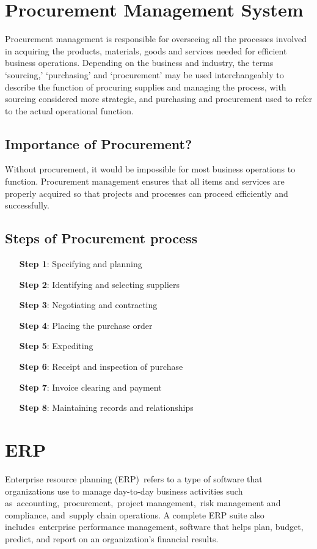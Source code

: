 \documentclass[12pt, a4paper]{article}
\begin{document}
\section{Procurement Management System}
Procurement management is responsible for overseeing all the processes involved
in acquiring the products, materials, goods and services needed for efficient
business operations. Depending on the business and industry, the terms
`sourcing,' `purchasing' and `procurement' may be used interchangeably to
describe the function of procuring supplies and managing the process, with
sourcing considered more strategic, and purchasing and procurement used to
refer to the actual operational function.

\subsection{Importance of Procurement?}
Without procurement, it would be impossible for most business operations to
function. Procurement management ensures that all items and services are
properly acquired so that projects and processes can proceed efficiently and
successfully.

\subsection{Steps of Procurement process}
\begin{itemize}
  \item [\textbf{Step 1}:] Specifying and planning
  \item [\textbf{Step 2}:] Identifying and selecting suppliers
  \item [\textbf{Step 3}:] Negotiating and contracting
  \item [\textbf{Step 4}:] Placing the purchase order
  \item [\textbf{Step 5}:] Expediting
  \item [\textbf{Step 6}:] Receipt and inspection of purchase
  \item [\textbf{Step 7}:] Invoice clearing and payment
  \item [\textbf{Step 8}:] Maintaining records and relationships
\end{itemize}

\section{ERP}
Enterprise resource planning (ERP) refers to a type of software that organizations use to manage day-to-day business activities such as accounting, procurement, project management, risk management and compliance, and supply chain operations. A complete ERP suite also includes enterprise performance management, software that helps plan, budget, predict, and report on an organization’s financial results.
\end{document}
